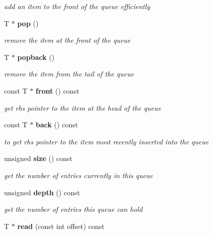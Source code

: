 \begin{DoxyCompactItemize}
\begin{DoxyCompactList}\small\item\em add an item to the front of the queue efficiently \item\end{DoxyCompactList}\item 
T $\ast$ {\bf pop} ()
\begin{DoxyCompactList}\small\item\em remove the item at the front of the queue \item\end{DoxyCompactList}\item 
T $\ast$ {\bf popback} ()
\begin{DoxyCompactList}\small\item\em remove the item from the tail of the queue \item\end{DoxyCompactList}\item 
const T $\ast$ {\bf front} () const 
\begin{DoxyCompactList}\small\item\em get rhs pointer to the item at the head of the queue \item\end{DoxyCompactList}\item 
const T $\ast$ {\bf back} () const \label{class_d_r_a_msim_i_i_1_1_queue_ae4969b401ba2c7b37f0becdcce115390}

\begin{DoxyCompactList}\small\item\em to get rhs pointer to the item most recently inserted into the queue \item\end{DoxyCompactList}\item 
unsigned {\bf size} () const \label{class_d_r_a_msim_i_i_1_1_queue_a52a5a98afc0edac59cfcd4efac0569c4}

\begin{DoxyCompactList}\small\item\em get the number of entries currently in this queue \item\end{DoxyCompactList}\item 
unsigned {\bf depth} () const \label{class_d_r_a_msim_i_i_1_1_queue_a193465ae95b739f1d55206fa6630856f}

\begin{DoxyCompactList}\small\item\em get the number of entries this queue can hold \item\end{DoxyCompactList}\item 
T $\ast$ {\bf read} (const int offset) const \label{class_d_r_a_msim_i_i_1_1_queue_a594030f83e50b8b97a3c1633394d5715}


\end{DoxyCompactItemize}
